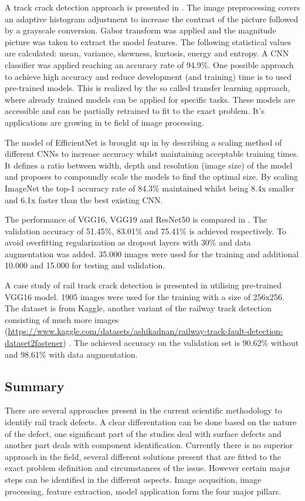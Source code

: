 \documentclass[10pt, final]{article}
\begin{document}
A track crack detection approach is presented in \cite{thendral_computer_2021}.
The image preprocessing covers an adaptive histogram adjustment to increase the contrast of the picture followed by a
grayscale conversion.
Gabor transform was applied and the magnitude picture was taken to extract the model features.
The following statistical values are calculated: mean, variance, skewness, kurtosis, energy and entropy.
A CNN classifier was applied reaching an accuracy rate of 94.9\%.
One possible approach to achieve high accuracy and reduce development (and training) time is to used pre-trained
models.
This is realized by the so called transfer learning approach, where already trained models can be applied for
specific tasks.
These models are accessible and can be partially retrained to fit to the exact problem.
It's applications are growing in te field of image processing.

The model of EfficientNet is brought up in \cite{tan_efficientnet_2020} by describing a scaling method of different
CNNs to increase accuracy whilst maintaining acceptable training times.
It defines a ratio between width, depth and resolution (image size) of the model and proposes to compoundly
scale the models to find the optimal size.
By scaling ImageNet the top-1 accuracy rate of 84.3\% maintained whilst being 8.4x smaller and 6.1x faster than
the best existing CNN.

The performance of VGG16, VGG19 and ResNet50 is compared in \cite{sharma_comparison_2022}.
The validation accuracy of 51.45\%, 83.01\% and 75.41\% is achieved respectively.
To avoid overfitting regularization as dropout layers with 30\% and data augmentation was added.
35.000 images were used for the training and additional 10.000 and 15.000 for testing and validation.

A case study of rail track crack detection is presented in \cite{bhat_classification_2022} utilising pre-trained
VGG16 model.
1905 images were used for the training with a size of 256x256.
The dataset is from Kaggle, another variant of the railway track detection consisting of much more images
(\url{https://www.kaggle.com/datasets/ashikadnan/railway-track-fault-detection-dataset2fastener}) \cite{_railway_}.
The achieved accuracy on the validation set is 90.62\% without and 98.61\% with data augmentation.

\subsection{Summary}
There are several approaches present in the current scientific methodology to identify rail track defects.
A clear differentation can be done based on the nature of the defect, one significant part of the studies deal with
surface defects and another part deals with component identification.
Currently there is no superior approach in the field, several different solutions present that are fitted to the exact
problem definition and circumstances of the issue.
However certain major steps can be identified in the different aspects.
Image acqusition, image processing, feature extraction, model application form the four major pillars.
\end{document}
